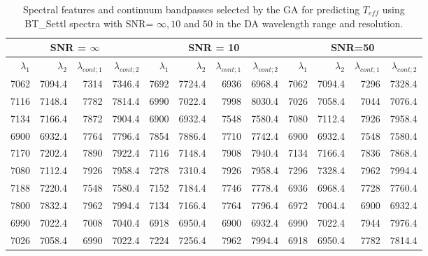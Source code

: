 \begin{table*}
\begin{center}
\begin{tabular}{rrrr | rrrr | rrrr }
  \hline
 \multicolumn{4}{c}{SNR = $\infty $} &  \multicolumn{4}{c}{SNR = 10} &  \multicolumn{4}{c}{SNR=50} \\
  \hline
$\lambda_1$ & $\lambda_2$ & $\lambda_{cont;1}$ & $\lambda_{cont;2} $ & $\lambda_1$ & $\lambda_2$ & $\lambda_{cont;1}$ & $\lambda_{cont;2} $ & $\lambda_1$ & $\lambda_2$ & $\lambda_{cont;1}$ & $\lambda_{cont;2} $ \\ 
  \hline
7062 & 7094.4 &	7314 & 7346.4 & 7692 & 7724.4 &	6936 & 6968.4  & 7062 & 7094.4 &  7296 & 7328.4 \\
7116 & 7148.4 &	7782 & 7814.4 & 6990 & 7022.4 &	7998 & 8030.4  & 7026 & 7058.4 &  7044 & 7076.4 \\
7134 & 7166.4 &	7872 & 7904.4 & 6900 & 6932.4 &	7548 & 7580.4  & 7080 & 7112.4 &  7926 & 7958.4 \\
6900 & 6932.4 &	7764 & 7796.4 & 7854 & 7886.4 &	7710 & 7742.4  & 6900 & 6932.4 &  7548 & 7580.4 \\
7170 & 7202.4 &	7890 & 7922.4 & 7116 & 7148.4 &	7908 & 7940.4  & 7134 & 7166.4 &  7836 & 7868.4 \\
7080 & 7112.4 &	7926 & 7958.4 & 7278 & 7310.4 &	7926 & 7958.4  & 7296 & 7328.4 &  7962 & 7994.4 \\
7188 & 7220.4 &	7548 & 7580.4 & 7152 & 7184.4 &	7746 & 7778.4  & 6936 & 6968.4 &  7728 & 7760.4 \\
7800 & 7832.4 &	7962 & 7994.4 & 7134 & 7166.4 &	7764 & 7796.4  & 6972 & 7004.4 &  6900 & 6932.4 \\
6990 & 7022.4 &	7008 & 7040.4 & 6918 & 6950.4 &	6900 & 6932.4  & 6990 & 7022.4 &  7944 & 7976.4 \\
7026 & 7058.4 &	6990 & 7022.4 & 7224 & 7256.4 &	7962 & 7994.4  & 6918 & 6950.4 &  7782 & 7814.4 \\

\hline
\end{tabular}
\caption {Spectral features and continuum bandpasses selected by the
  GA for predicting $ T_{eff}$ using BT\_Settl spectra with SNR= $\infty ,10 $ and
  $ 50 $ in the DA wavelength range and
  resolution.} \label{tab:ipac-teff-noisy}
\end{center}
\end{table*}


